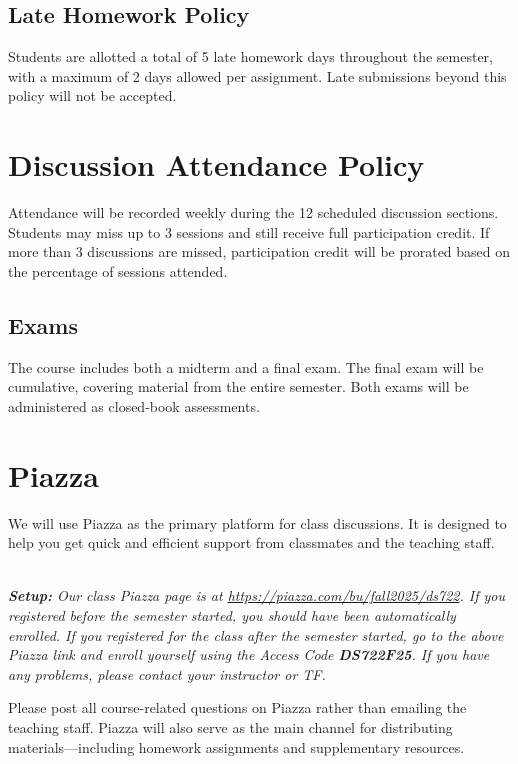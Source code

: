 \documentclass[11pt]{article}
\begin{document}
\subsection*{Late Homework Policy}

Students are allotted a total of 5 late homework days throughout the semester, with a maximum of 2 days allowed per assignment. Late submissions beyond this policy will not be accepted.

\section*{Discussion Attendance Policy}

Attendance will be recorded weekly during the 12 scheduled discussion sections. Students may miss up to 3 sessions and still receive full participation credit. If more than 3 discussions are missed, participation credit will be prorated based on the percentage of sessions attended.

\subsection*{Exams}

The course includes both a midterm and a final exam. The final exam will be cumulative, covering material from the entire semester. Both exams will be administered as closed-book assessments.

\section*{Piazza}

We will use Piazza as the primary platform for class discussions. It is designed to help you get quick and efficient support from classmates and the teaching staff.

~\\\emph{\textbf{Setup:} Our class Piazza
page is at \url{https://piazza.com/bu/fall2025/ds722}.  If you
registered before the semester started, you should have been automatically enrolled. If you registered for the class after the semester started, go to the above Piazza link and enroll yourself using the Access Code {\bf DS722F25}. If you have any problems, please contact your instructor or TF.}

Please post all course-related questions on Piazza rather than emailing the teaching staff. Piazza will also serve as the main channel for distributing materials—including homework assignments and supplementary resources.
\end{document}
